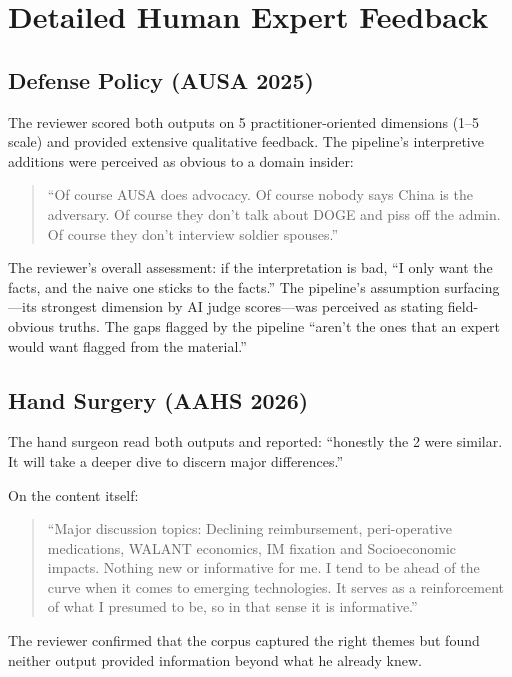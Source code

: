 \documentclass{article}
\begin{document}
\section{Detailed Human Expert Feedback}
\label{app:human_detail}

\subsection{Defense Policy (AUSA 2025)}

The reviewer scored both outputs on 5 practitioner-oriented dimensions (1--5 scale) and provided extensive qualitative feedback. The pipeline's interpretive additions were perceived as obvious to a domain insider:

\begin{quote}
``Of course AUSA does advocacy. Of course nobody says China is the adversary. Of course they don't talk about DOGE and piss off the admin. Of course they don't interview soldier spouses.''
\end{quote}

The reviewer's overall assessment: if the interpretation is bad, ``I only want the facts, and the naive one sticks to the facts.'' The pipeline's assumption surfacing---its strongest dimension by AI judge scores---was perceived as stating field-obvious truths. The gaps flagged by the pipeline ``aren't the ones that an expert would want flagged from the material.''

\subsection{Hand Surgery (AAHS 2026)}

The hand surgeon read both outputs and reported: ``honestly the 2 were similar. It will take a deeper dive to discern major differences.''

On the content itself:
\begin{quote}
``Major discussion topics: Declining reimbursement, peri-operative medications, WALANT economics, IM fixation and Socioeconomic impacts. Nothing new or informative for me. I tend to be ahead of the curve when it comes to emerging technologies. It serves as a reinforcement of what I presumed to be, so in that sense it is informative.''
\end{quote}

The reviewer confirmed that the corpus captured the right themes but found neither output provided information beyond what he already knew.
\end{document}
